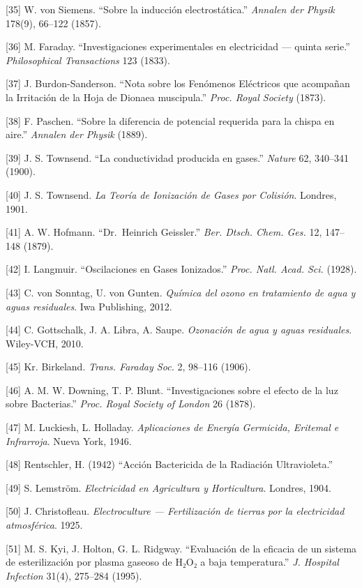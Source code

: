 \documentclass[
]{article}
\begin{document}
{[}35{]} W. von Siemens. ``Sobre la inducción electrostática.''
\emph{Annalen der Physik} 178(9), 66--122 (1857).

{[}36{]} M. Faraday. ``Investigaciones experimentales en electricidad
--- quinta serie.'' \emph{Philosophical Transactions} 123 (1833).

{[}37{]} J. Burdon-Sanderson. ``Nota sobre los Fenómenos Eléctricos que
acompañan la Irritación de la Hoja de Dionaea muscipula.'' \emph{Proc.
Royal Society} (1873).

{[}38{]} F. Paschen. ``Sobre la diferencia de potencial requerida para
la chispa en aire.'' \emph{Annalen der Physik} (1889).

{[}39{]} J. S. Townsend. ``La conductividad producida en gases.''
\emph{Nature} 62, 340--341 (1900).

{[}40{]} J. S. Townsend. \emph{La Teoría de Ionización de Gases por
Colisión}. Londres, 1901.

{[}41{]} A. W. Hofmann. ``Dr.~Heinrich Geissler.'' \emph{Ber. Dtsch.
Chem. Ges.} 12, 147--148 (1879).

{[}42{]} I. Langmuir. ``Oscilaciones en Gases Ionizados.'' \emph{Proc.
Natl. Acad. Sci.} (1928).

{[}43{]} C. von Sonntag, U. von Gunten. \emph{Química del ozono en
tratamiento de agua y aguas residuales}. Iwa Publishing, 2012.

{[}44{]} C. Gottschalk, J. A. Libra, A. Saupe. \emph{Ozonación de agua y
aguas residuales}. Wiley-VCH, 2010.

{[}45{]} Kr. Birkeland. \emph{Trans. Faraday Soc.} 2, 98--116 (1906).

{[}46{]} A. M. W. Downing, T. P. Blunt. ``Investigaciones sobre el
efecto de la luz sobre Bacterias.'' \emph{Proc. Royal Society of London}
26 (1878).

{[}47{]} M. Luckiesh, L. Holladay. \emph{Aplicaciones de Energía
Germicida, Eritemal e Infrarroja}. Nueva York, 1946.

{[}48{]} Rentschler, H. (1942) ``Acción Bactericida de la Radiación
Ultravioleta.''

{[}49{]} S. Lemström. \emph{Electricidad en Agricultura y Horticultura}.
Londres, 1904.

{[}50{]} J. Christofleau. \emph{Electroculture --- Fertilización de
tierras por la electricidad atmosférica}. 1925.

{[}51{]} M. S. Kyi, J. Holton, G. L. Ridgway. ``Evaluación de la
eficacia de un sistema de esterilización por plasma gaseoso de H₂O₂ a
baja temperatura.'' \emph{J. Hospital Infection} 31(4), 275--284 (1995).
\end{document}
